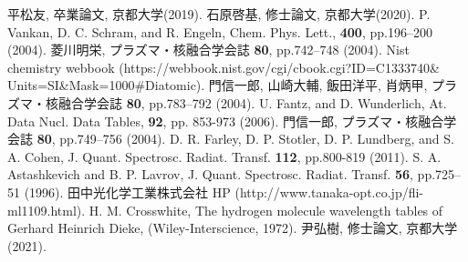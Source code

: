 \begin{thebibliography}{99}
     平松友, 卒業論文, 京都大学(2019).
     石原啓基, 修士論文, 京都大学(2020).
     P. Vankan, D. C. Schram, and R. Engeln, Chem. Phys. Lett., \textbf{400}, pp.196–200 (2004).
     菱川明栄, プラズマ・核融合学会誌 \textbf{80}, pp.742–748 (2004).
     Nist chemistry webbook (https://webbook.nist.gov/cgi/cbook.cgi?ID=C1333740\&\\Units=SI\&Mask=1000\#Diatomic).
     門信一郎, 山崎大輔, 飯田洋平, 肖炳甲, プラズマ・核融合学会誌 \textbf{80}, pp.783–792 (2004).
     U. Fantz, and D. Wunderlich, At. Data Nucl. Data Tables, \textbf{92}, pp. 853-973 (2006).
     門信一郎, プラズマ・核融合学会誌 \textbf{80}, pp.749–756 (2004).
     D. R. Farley, D. P. Stotler, D. P. Lundberg, and S. A. Cohen, J. Quant. Spectrosc. Radiat. Transf. \textbf{112}, pp.800-819 (2011).
     S. A. Astashkevich and B. P. Lavrov, J. Quant. Spectrosc. Radiat. Transf. \textbf{56}, pp.725–51 (1996).
     田中光化学工業株式会社 HP (http://www.tanaka-opt.co.jp/fli-ml1109.html).
     H. M. Crosswhite, The hydrogen molecule wavelength tables of Gerhard Heinrich Dieke, (Wiley-Interscience, 1972).
     尹弘樹, 修士論文, 京都大学(2021).
\end{thebibliography}